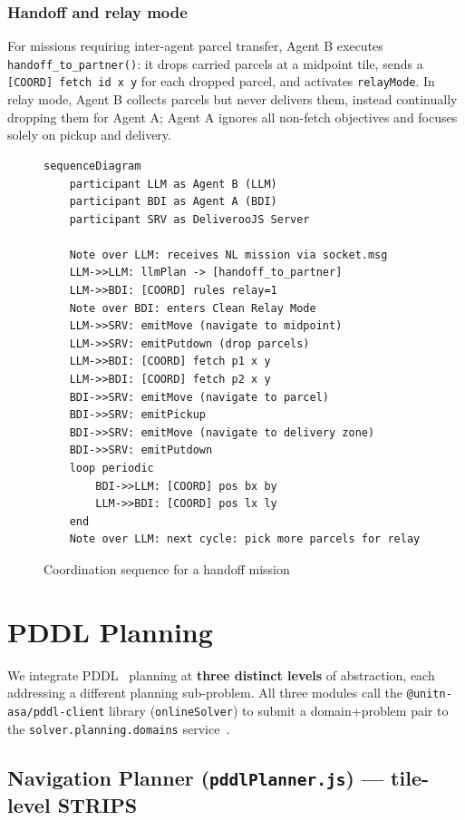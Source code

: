 \documentclass[10pt,a4paper,twocolumn]{article}
\begin{document}
\subsubsection*{Handoff and relay mode}
For missions requiring inter-agent parcel transfer, Agent B executes
\texttt{handoff\_to\_partner()}: it drops carried parcels at a midpoint tile,
sends a \texttt{[COORD] fetch id x y} for each dropped parcel, and activates
\texttt{relayMode}.  In relay mode, Agent B collects parcels but never delivers
them, instead continually dropping them for Agent A; Agent A ignores all
non-fetch objectives and focuses solely on pickup and delivery.

\begin{figure}[H]
\caption{Coordination sequence for a handoff mission}
\begin{lstlisting}[language={}]
sequenceDiagram
    participant LLM as Agent B (LLM)
    participant BDI as Agent A (BDI)
    participant SRV as DeliverooJS Server

    Note over LLM: receives NL mission via socket.msg
    LLM->>LLM: llmPlan -> [handoff_to_partner]
    LLM->>BDI: [COORD] rules relay=1
    Note over BDI: enters Clean Relay Mode
    LLM->>SRV: emitMove (navigate to midpoint)
    LLM->>SRV: emitPutdown (drop parcels)
    LLM->>BDI: [COORD] fetch p1 x y
    LLM->>BDI: [COORD] fetch p2 x y
    BDI->>SRV: emitMove (navigate to parcel)
    BDI->>SRV: emitPickup
    BDI->>SRV: emitMove (navigate to delivery zone)
    BDI->>SRV: emitPutdown
    loop periodic
        BDI->>LLM: [COORD] pos bx by
        LLM->>BDI: [COORD] pos lx ly
    end
    Note over LLM: next cycle: pick more parcels for relay
\end{lstlisting}
\end{figure}

\section{PDDL Planning}
\label{sec:pddl}

We integrate PDDL~\cite{mcdermott1998} planning at \textbf{three distinct levels}
of abstraction, each addressing a different planning sub-problem.  All three
modules call the \texttt{@unitn-asa/pddl-client} library (\texttt{onlineSolver})
to submit a domain+problem pair to the \texttt{solver.planning.domains}
service~\cite{planningdomains}.

\subsection{Navigation Planner (\texttt{pddlPlanner.js}) — tile-level STRIPS}
\end{document}

